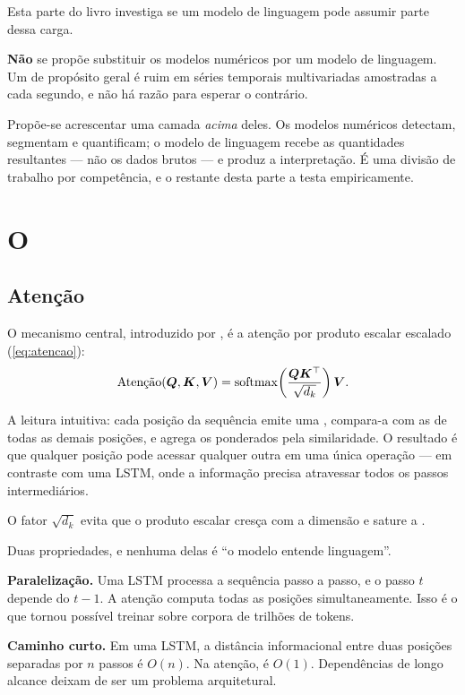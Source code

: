 Esta parte do livro investiga se um modelo de linguagem pode assumir parte dessa carga.

\begin{destaque}
\textbf{Não} se propõe substituir os modelos numéricos por um modelo de linguagem. Um
 de propósito geral é ruim em séries temporais multivariadas
amostradas a cada segundo, e não há razão para esperar o contrário.

Propõe-se acrescentar uma camada \emph{acima} deles. Os modelos numéricos detectam,
segmentam e quantificam; o modelo de linguagem recebe as quantidades resultantes ---
não os dados brutos --- e produz a interpretação. É uma divisão de trabalho por
competência, e o restante desta parte a testa empiricamente.
\end{destaque}

\section{O }

\subsection{Atenção}

O mecanismo central, introduzido por \citet{Vaswani2017}, é a atenção por produto escalar
escalado (\cref{eq:atencao}):
\[
  \text{Atenção}(\bm{Q}, \bm{K}, \bm{V}) =
  \operatorname{softmax}\!\left( \frac{\bm{Q}\bm{K}^\top}{\sqrt{d_k}} \right) \bm{V}.
\]

A leitura intuitiva: cada posição da sequência emite uma , compara-a
com as  de todas as demais posições, e agrega os 
ponderados pela similaridade. O resultado é que qualquer posição pode acessar qualquer
outra em uma única operação --- em contraste com uma LSTM, onde a informação precisa
atravessar todos os passos intermediários.

O fator $\sqrt{d_k}$ evita que o produto escalar cresça com a dimensão e sature a
.

\begin{destaque}
Duas propriedades, e nenhuma delas é ``o modelo entende linguagem''.

\textbf{Paralelização.} Uma LSTM processa a sequência passo a passo, e o passo $t$ depende
do $t-1$. A atenção computa todas as posições simultaneamente. Isso é o que tornou
possível treinar sobre corpora de trilhões de tokens.

\textbf{Caminho curto.} Em uma LSTM, a distância informacional entre duas posições
separadas por $n$ passos é $O(n)$. Na atenção, é $O(1)$. Dependências de longo alcance
deixam de ser um problema arquitetural.
\end{destaque}


